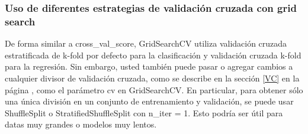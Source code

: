 \newpage


\subsubsection{Uso de diferentes estrategias de validación cruzada con  grid search}

De forma similar a {\ttfamily cross\_val\_score,  GridSearchCV} utiliza validación cruzada estratificada de k-fold por defecto para la clasificación y validación cruzada k-fold para la regresión.  Sin embargo, usted también puede pasar o agregar cambios a cualquier divisor de validación cruzada, como se describe en la sección \ref{VC} en la página \pageref*{VC}, como el parámetro {\ttfamily cv} en {\ttfamily GridSearchCV}. En particular, para obtener sólo una única división en un conjunto de entrenamiento y validación, se  puede usar  {\ttfamily ShuffleSplit o StratifiedShuffleSplit} con {\ttfamily n\_iter = 1}. Esto podría ser útil para datas muy grandes o modelos muy lentos.


